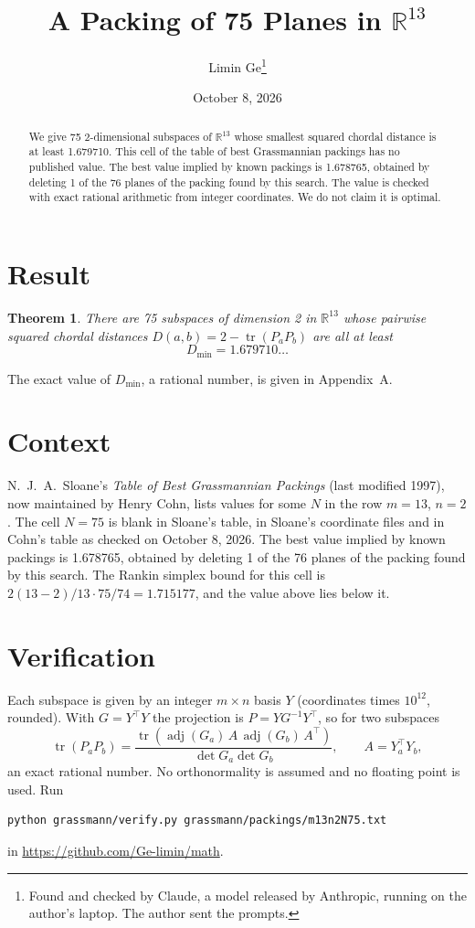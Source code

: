 \documentclass[11pt,a4paper]{article}
\title{A Packing of 75 Planes in $\mathbb{R}^{13}$}
\author{Limin Ge\thanks{Found and checked by Claude, a model released by Anthropic, running on the author's laptop. The author sent the prompts.}}
\date{October 8, 2026}
\newtheorem*{theorem}{Theorem}
\begin{document}
\maketitle
\begin{abstract}
We give 75 2-dimensional subspaces of $\mathbb{R}^{13}$ whose smallest squared chordal distance is at least 1.679710. This cell of the table of best Grassmannian packings has no published value. The best value implied by known packings is 1.678765, obtained by deleting 1 of the 76 planes of the packing found by this search. The value is checked with exact rational arithmetic from integer coordinates. We do not claim it is optimal.
\end{abstract}

\section{Result}
\begin{theorem}
There are 75 subspaces of dimension 2 in $\mathbb{R}^{13}$ whose pairwise squared chordal distances $D(a,b) = 2 - \operatorname{tr}(P_aP_b)$ are all at least
\[ D_{\min} = 1.679710\ldots \]
\end{theorem}
The exact value of $D_{\min}$, a rational number, is given in Appendix~A.


\section{Context}
N.~J.~A.~Sloane's \emph{Table of Best Grassmannian Packings} (last modified 1997), now maintained by Henry Cohn, lists values for some $N$ in the row $m=13$, $n=2$. The cell $N=75$ is blank in Sloane's table, in Sloane's coordinate files and in Cohn's table as checked on October 8, 2026. The best value implied by known packings is 1.678765, obtained by deleting 1 of the 76 planes of the packing found by this search. The Rankin simplex bound for this cell is $2(13-2)/13\cdot 75/74 = 1.715177$, and the value above lies below it.


\section{Verification}
Each subspace is given by an integer $m\times n$ basis $Y$ (coordinates times $10^{12}$, rounded). With $G=Y^\top Y$ the projection is $P=YG^{-1}Y^\top$, so for two subspaces
\[ \operatorname{tr}(P_aP_b)=\frac{\operatorname{tr}(\operatorname{adj}(G_a)\,A\,\operatorname{adj}(G_b)\,A^\top)}{\det G_a\det G_b},\qquad A=Y_a^\top Y_b, \]
an exact rational number. No orthonormality is assumed and no floating point is used. Run
\begin{verbatim}
python grassmann/verify.py grassmann/packings/m13n2N75.txt
\end{verbatim}
in \url{https://github.com/Ge-limin/math}.
\end{document}
